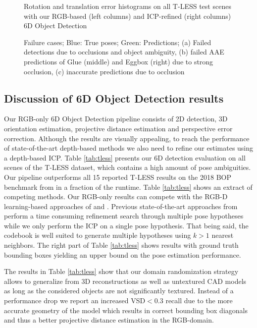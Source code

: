 {{\begin{figure*}
{\begin{minipage}[t]{0.5\columnwidth}
\begin{tikzpicture}
\end{tikzpicture} 	\end{minipage}}
	\caption{Rotation and translation error histograms on all T-LESS test scenes with our RGB-based (left columns) and ICP-refined (right columns) 6D Object Detection }
	\label{fig:histo}
\end{figure*}
\begin{figure*}[t]\centering
	\caption{Failure cases; Blue: True poses; Green: Predictions; (a) Failed detections due to occlusions and object ambiguity, (b) failed AAE predictions of Glue (middle) and Eggbox (right) due to strong occlusion, (c) inaccurate predictions due to occlusion}
	\label{fig:failures}\end{figure*}
	\subsection{Discussion of 6D Object Detection results}
	Our RGB-only 6D Object Detection pipeline consists of 2D detection, 3D orientation estimation, projective distance estimation and perspective error correction. Although the results are visually appealing, to reach the performance of state-of-the-art depth-based methods we also need to refine our estimates using a depth-based \gls{ICP}. 
	Table \ref{tab:tless} presents our 6D detection evaluation on all scenes of the T-LESS dataset, which contains a high amount of pose ambiguities. Our pipeline outperforms all 15 reported T-LESS results on the 2018 BOP benchmark from \cite{hodan2018bop} in a fraction of the runtime. Table \ref{tab:tless} shows an extract of competing methods. Our RGB-only results can compete with the RGB-D learning-based approaches of \cite{brachmann2016uncertainty} and \cite{kehl2016deep}. Previous state-of-the-art approaches from \cite{vidal20186d,drost2010model} perform a time consuming refinement search through multiple pose hypotheses while we only perform the ICP on a single pose hypothesis. That being said, the codebook is well suited to generate multiple hypotheses using $k>1$ nearest neighbors. The right part of Table \ref{tab:tless} shows results with ground truth bounding boxes yielding an upper bound on the pose estimation performance.
	
	The results in Table \ref{tab:tless} show that our domain randomization strategy allows to generalize from 3D reconstructions as well as untextured CAD models as long as the considered objects are not significantly textured. Instead of a performance drop we report an increased \gls{VSD}$<0.3$ recall due to the more accurate geometry of the model which results in correct bounding box diagonals and thus a better projective distance estimation in the RGB-domain.
	
}}
